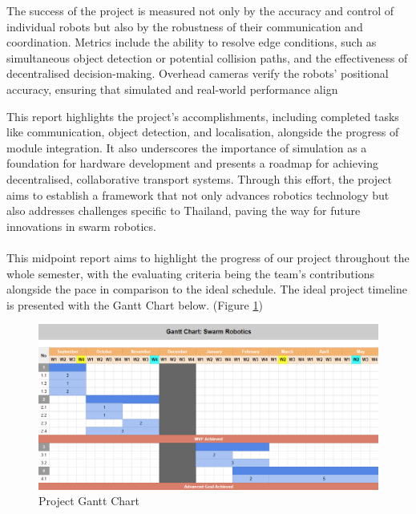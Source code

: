 The success of the project is measured not only by the accuracy and control of individual robots but also by the robustness of their communication and coordination. Metrics include the ability to resolve edge conditions, such as simultaneous object detection or potential collision paths, and the effectiveness of decentralised decision-making. Overhead cameras verify the robots’ positional accuracy, ensuring that simulated and real-world performance align

This report highlights the project’s accomplishments, including completed tasks like communication, object detection, and localisation, alongside the progress of module integration. It also underscores the importance of simulation as a foundation for hardware development and presents a roadmap for achieving decentralised, collaborative transport systems. Through this effort, the project aims to establish a framework that not only advances robotics technology but also addresses challenges specific to Thailand, paving the way for future innovations in swarm robotics.

\paragraph*{}
This midpoint report aims to highlight the progress of our project throughout the whole semester, with the evaluating criteria being the team's contributions alongside the pace in comparison to the ideal schedule. The ideal project timeline is presented with the Gantt Chart below. (Figure \ref{fig:gantt-chart})

\begin{figure} [H]
    \centering
    \includegraphics[width=1\linewidth]{assets/images/introduction/gantt_chart.png}
    \caption{Project Gantt Chart}
    \label{fig:gantt-chart}
\end{figure}

